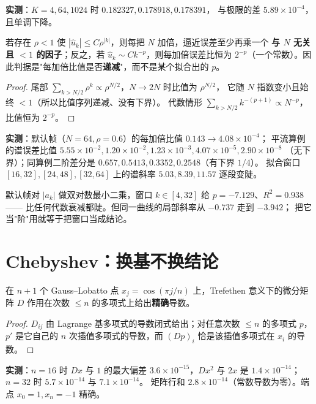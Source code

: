 \textbf{实测}：$K=4,64,1024$ 时 $0.182327,0.178918,0.178391$，
与极限的差 $5.89\times10^{-4}$，且单调下降。

\begin{theorem}[指数收敛的可执行判据]
若存在 $\rho<1$ 使 $|\hat u_k|\le C\rho^{|k|}$，则每把 $N$ 加倍，逼近误差至少再乘一个
\textbf{与 $N$ 无关且 $<1$ 的因子}；反之，若 $\hat u_k\sim Ck^{-p}$，则每加倍误差比恒为
$2^{-p}$（一个常数）。因此判据是"每加倍比值是否\textbf{递减}"，而不是某个拟合出的 $p$。
\end{theorem}

\begin{proof}
尾部 $\sum_{k>N/2}\rho^k\propto\rho^{N/2}$，$N\to2N$ 时比值为 $\rho^{N/2}$，
它随 $N$ 指数变小且始终 $<1$（所以比值序列递减、没有下界）。
代数情形 $\sum_{k>N/2}k^{-(p+1)}\propto N^{-p}$，比值恒为 $2^{-p}$。
\end{proof}

\textbf{实测}：默认帧（$N=64,\rho=0.6$）的每加倍比值 $0.143\to4.08\times10^{-4}$；
平流算例的谱误差比值 $5.55\times10^{-2},1.20\times10^{-2},1.23\times10^{-3},4.07\times10^{-5},2.90\times10^{-8}$
（无下界）；同算例二阶差分是 $0.657,0.5413,0.3352,0.2548$（有下界 $1/4$）。
拟合窗口 $[16,32],[24,48],[32,64]$ 上的谱斜率 $5.03,8.39,11.57$ 逐段变陡。

\begin{remark}
默认帧对 $|a_k|$ 做双对数最小二乘，窗口 $k\in[4,32]$ 给 $p=-7.129$、$R^2=0.938$——
比任何代数衰减都陡。但同一曲线的局部斜率从 $-0.737$ 走到 $-3.942$；
把它当"阶"用就等于把窗口当成结论。
\end{remark}

\section{Chebyshev：换基不换结论}

\begin{theorem}
在 $n+1$ 个 Gauss--Lobatto 点 $x_j=\cos(\pi j/n)$ 上，Trefethen 意义下的微分矩阵
$D$ 作用在次数 $\le n$ 的多项式上给出\textbf{精确}导数。
\end{theorem}

\begin{proof}
$D_{ij}$ 由 Lagrange 基多项式的导数闭式给出；对任意次数 $\le n$ 的多项式 $p$，
$p'$ 是它自己的 $n$ 次插值多项式的导数，而 $(Dp)_i$ 恰是该插值多项式在 $x_i$ 的导数。
\end{proof}

\textbf{实测}：$n=16$ 时 $D x$ 与 $1$ 的最大偏差 $3.6\times10^{-15}$，$D x^2$ 与 $2x$ 是
$1.4\times10^{-14}$；$n=32$ 时 $5.7\times10^{-14}$ 与 $7.1\times10^{-14}$。
矩阵行和 $2.8\times10^{-14}$（常数导数为零）。端点 $x_0=1,x_n=-1$ 精确。


